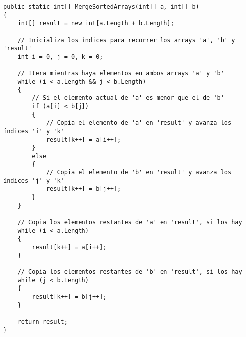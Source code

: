 \begin{lstlisting}
public static int[] MergeSortedArrays(int[] a, int[] b)
{
    int[] result = new int[a.Length + b.Length];

    // Inicializa los índices para recorrer los arrays 'a', 'b' y 'result'
    int i = 0, j = 0, k = 0;

    // Itera mientras haya elementos en ambos arrays 'a' y 'b'
    while (i < a.Length && j < b.Length)
    {
        // Si el elemento actual de 'a' es menor que el de 'b'
        if (a[i] < b[j])
        {
            // Copia el elemento de 'a' en 'result' y avanza los índices 'i' y 'k'
            result[k++] = a[i++];
        }
        else
        {
            // Copia el elemento de 'b' en 'result' y avanza los índices 'j' y 'k'
            result[k++] = b[j++];
        }
    }

    // Copia los elementos restantes de 'a' en 'result', si los hay
    while (i < a.Length)
    {
        result[k++] = a[i++];
    }

    // Copia los elementos restantes de 'b' en 'result', si los hay
    while (j < b.Length)
    {
        result[k++] = b[j++];
    }

    return result;
}
\end{lstlisting}